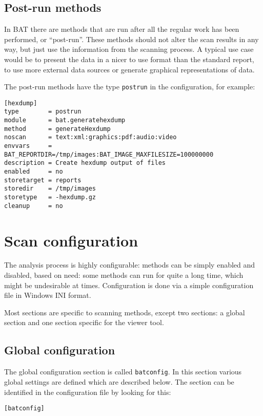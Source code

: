 \documentclass[10pt,a4paper]{article}
\begin{document}
\subsection{Post-run methods}

In BAT there are methods that are run after all the regular work has been
performed, or ``post-run''. These methods should not alter the scan results in
any way, but just use the information from the scanning process. A typical use
case would be to present the data in a nicer to use format than the standard
report, to use more external data sources or generate graphical representations
of data.

The post-run methods have the type \texttt{postrun} in the configuration, for
example:

\begin{verbatim}
[hexdump]
type        = postrun
module      = bat.generatehexdump
method      = generateHexdump
noscan      = text:xml:graphics:pdf:audio:video
envvars     = BAT_REPORTDIR=/tmp/images:BAT_IMAGE_MAXFILESIZE=100000000
description = Create hexdump output of files
enabled     = no
storetarget = reports
storedir    = /tmp/images
storetype   = -hexdump.gz
cleanup     = no
\end{verbatim}

\section{Scan configuration}

The analysis process is highly configurable: methods can be simply enabled and
disabled, based on need: some methods can run for quite a long time, which
might be undesirable at times. Configuration is done via a simple configuration
file in Windows INI format.

Most sections are specific to scanning methods, except two sections: a global
section and one section specific for the viewer tool.

\subsection{Global configuration}

The global configuration section is called \texttt{batconfig}. In this section
various global settings are defined which are described below. The section can
be identified in the configuration file by looking for this:

\begin{verbatim}
[batconfig]
\end{verbatim}
\end{document}
